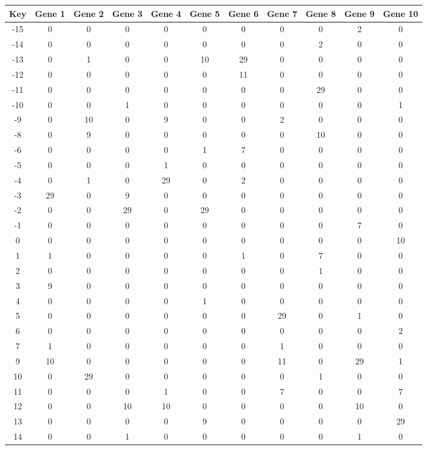 \begin{tabular}{|c|c|c|c|c|c|c|c|c|c|c|}
\hline
Key & Gene 1 & Gene 2 & Gene 3 & Gene 4 & Gene 5 & Gene 6 & Gene 7 & Gene 8 & Gene 9 & Gene 10 \\
\hline
-15 & 0 & 0 & 0 & 0 & 0 & 0 & 0 & 0 & 2 & 0 \\
-14 & 0 & 0 & 0 & 0 & 0 & 0 & 0 & 2 & 0 & 0 \\
-13 & 0 & 1 & 0 & 0 & 10 & 29 & 0 & 0 & 0 & 0 \\
-12 & 0 & 0 & 0 & 0 & 0 & 11 & 0 & 0 & 0 & 0 \\
-11 & 0 & 0 & 0 & 0 & 0 & 0 & 0 & 29 & 0 & 0 \\
-10 & 0 & 0 & 1 & 0 & 0 & 0 & 0 & 0 & 0 & 1 \\
-9 & 0 & 10 & 0 & 9 & 0 & 0 & 2 & 0 & 0 & 0 \\
-8 & 0 & 9 & 0 & 0 & 0 & 0 & 0 & 10 & 0 & 0 \\
-6 & 0 & 0 & 0 & 0 & 1 & 7 & 0 & 0 & 0 & 0 \\
-5 & 0 & 0 & 0 & 1 & 0 & 0 & 0 & 0 & 0 & 0 \\
-4 & 0 & 1 & 0 & 29 & 0 & 2 & 0 & 0 & 0 & 0 \\
-3 & 29 & 0 & 9 & 0 & 0 & 0 & 0 & 0 & 0 & 0 \\
-2 & 0 & 0 & 29 & 0 & 29 & 0 & 0 & 0 & 0 & 0 \\
-1 & 0 & 0 & 0 & 0 & 0 & 0 & 0 & 0 & 7 & 0 \\
0 & 0 & 0 & 0 & 0 & 0 & 0 & 0 & 0 & 0 & 10 \\
1 & 1 & 0 & 0 & 0 & 0 & 1 & 0 & 7 & 0 & 0 \\
2 & 0 & 0 & 0 & 0 & 0 & 0 & 0 & 1 & 0 & 0 \\
3 & 9 & 0 & 0 & 0 & 0 & 0 & 0 & 0 & 0 & 0 \\
4 & 0 & 0 & 0 & 0 & 1 & 0 & 0 & 0 & 0 & 0 \\
5 & 0 & 0 & 0 & 0 & 0 & 0 & 29 & 0 & 1 & 0 \\
6 & 0 & 0 & 0 & 0 & 0 & 0 & 0 & 0 & 0 & 2 \\
7 & 1 & 0 & 0 & 0 & 0 & 0 & 1 & 0 & 0 & 0 \\
9 & 10 & 0 & 0 & 0 & 0 & 0 & 11 & 0 & 29 & 1 \\
10 & 0 & 29 & 0 & 0 & 0 & 0 & 0 & 1 & 0 & 0 \\
11 & 0 & 0 & 0 & 1 & 0 & 0 & 7 & 0 & 0 & 7 \\
12 & 0 & 0 & 10 & 10 & 0 & 0 & 0 & 0 & 10 & 0 \\
13 & 0 & 0 & 0 & 0 & 9 & 0 & 0 & 0 & 0 & 29 \\
14 & 0 & 0 & 1 & 0 & 0 & 0 & 0 & 0 & 1 & 0 \\
\hline
\end{tabular}